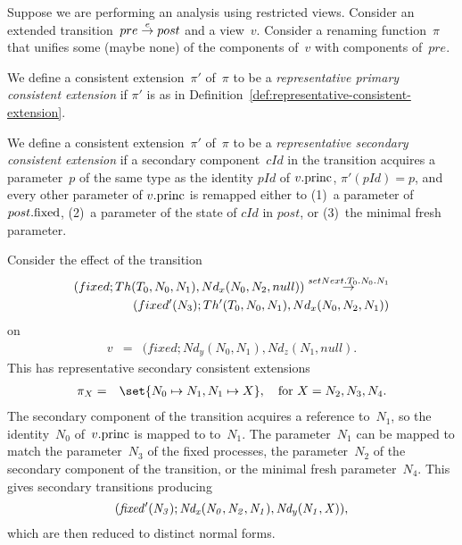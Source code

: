 \begin{definition} 
\label{def:representative-consistent-extension-singleRef}
Suppose we are performing an analysis using restricted views.  Consider an
extended transition~$pre \stackrel{e}\rightarrow post$ and a view~$v$.  Consider a renaming
function~$\pi$ that unifies some (maybe none) of the components of~$v$ with
components of~$pre$.  

We define a consistent extension~$\pi'$ of~$\pi$ to be a
\emph{representative primary consistent extension} if  $\pi'$ is as in
  Definition~\ref{def:representative-consistent-extension}.

We define a consistent extension~$\pi'$ of~$\pi$ to be a \emph{representative
  secondary consistent extension} if a secondary component~$cId$ in the
transition acquires a parameter~$p$ of the same type as the identity $pId$ of
$v.\mathrm{princ}$, $\pi'(pId) = p$, and every other parameter of $v.\mathrm{princ}$ is
remapped either to (1)~a parameter of $post.\mathrm{fixed}$, (2)~a parameter of the
state of $cId$ in $post$, or (3)~the minimal fresh parameter.
\end{definition}


\begin{example}
Consider the effect of the transition
\[
\begin{align}
(fixed; Th(T_0,N_0,N_1), Nd_x(N_0,N_2,null))   \stackrel{setNext.T_0.N_0.N_1}\rightarrow \\
\qquad (fixed'(N_3); Th'(T_0,N_0,N_1), Nd_x(N_0,N_2,N_1)) 
\end{align}
\]
on
\begin{eqnarray*}
v & = &  (fixed; Nd_y(N_0,N_1), Nd_z(N_1,null).
\end{eqnarray*}
%
This has representative secondary consistent extensions
\begin{eqnarray*}
\pi_X & = & \set{N_0 \mapsto N_1, N_1 \mapsto X},
  \quad \mbox{for $X = N_2, N_3, N_4$}.
\end{eqnarray*}
%
The secondary component of the transition acquires a reference to~$N_1$, so
the identity~$N_0$ of~$v.\mathrm{princ}$ is mapped to to~$N_1$.  The parameter~$N_1$
can be mapped to match the parameter~$N_3$ of the fixed processes, the
parameter~$N_2$ of the secondary component of the transition, or the minimal
fresh parameter~$N_4$.
%
This gives secondary transitions producing
\[{\it
(fixed'(N_3); Nd_x(N_0,N_2,N_1), Nd_y(N_1,X)),}
\] 
which are then reduced to distinct normal forms.
\end{example}

